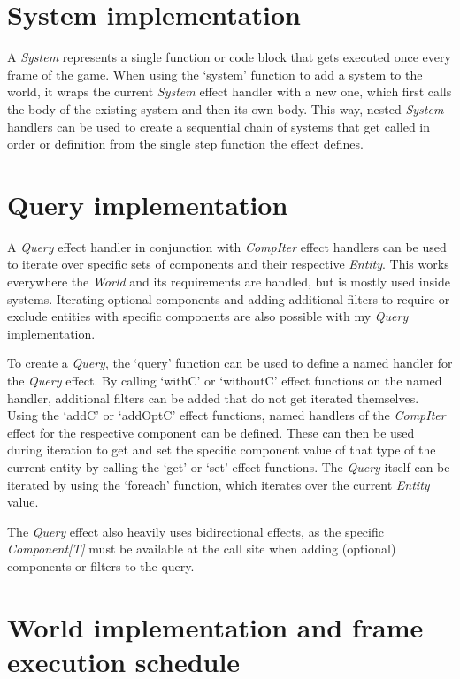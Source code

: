 \section{System implementation}

A \textit{System} represents a single function or code block that gets executed once every frame of the game. When using the `system' function to add a system to the world, it wraps the current \textit{System} effect handler with a new one, which first calls the body of the existing system and then its own body. This way, nested \textit{System} handlers can be used to create a sequential chain of systems that get called in order or definition from the single step function the effect defines.

\section{Query implementation}

A \textit{Query} effect handler in conjunction with \textit{CompIter} effect handlers can be used to iterate over specific sets of components and their respective \textit{Entity}. This works everywhere the \textit{World} and its requirements are handled, but is mostly used inside systems. Iterating optional components and adding additional filters to require or exclude entities with specific components are also possible with my \textit{Query} implementation.

To create a \textit{Query}, the `query' function can be used to define a named handler for the \textit{Query} effect. By calling `withC' or `withoutC' effect functions on the named handler, additional filters can be added that do not get iterated themselves. Using the `addC' or `addOptC' effect functions, named handlers of the \textit{CompIter} effect for the respective component can be defined. These can then be used during iteration to get and set the specific component value of that type of the current entity by calling the `get' or `set' effect functions. The \textit{Query} itself can be iterated by using the `foreach' function, which iterates over the current \textit{Entity} value.

The \textit{Query} effect also heavily uses bidirectional effects, as the specific \textit{Component[T]} must be available at the call site when adding (optional) components or filters to the query.

\section{World implementation and frame execution schedule}


